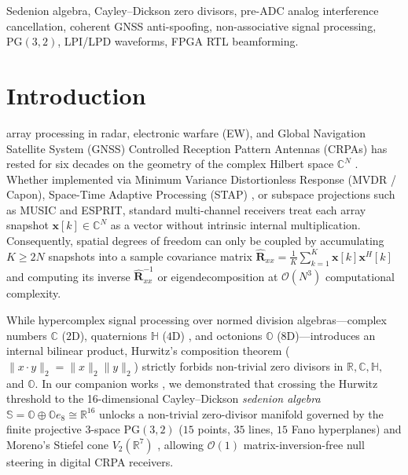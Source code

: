 \documentclass[journal,twoside]{IEEEtran}
\theoremstyle{definition}
\theoremstyle{remark}
\newcommand{\R}{\mathbb{R}}
\newcommand{\C}{\mathbb{C}}
\newcommand{\Ha}{\mathbb{H}}
\newcommand{\Oc}{\mathbb{O}}
\newcommand{\Se}{\mathbb{S}}
\newcommand{\PG}{\mathrm{PG}}
\begin{document}
\begin{IEEEkeywords}
Sedenion algebra, Cayley--Dickson zero divisors, pre-ADC analog interference cancellation, coherent GNSS anti-spoofing, non-associative signal processing, $\PG(3,2)$, LPI/LPD waveforms, FPGA RTL beamforming.
\end{IEEEkeywords}

\section{Introduction}
\label{sec:intro}
 array processing in radar, electronic warfare (EW), and Global Navigation Satellite System (GNSS) Controlled Reception Pattern Antennas (CRPAs) has rested for six decades on the geometry of the complex Hilbert space $\C^N$ \cite{Capon1969,VanTrees2002}. Whether implemented via Minimum Variance Distortionless Response (MVDR / Capon), Space-Time Adaptive Processing (STAP) \cite{Ward1994}, or subspace projections such as MUSIC and ESPRIT, standard multi-channel receivers treat each array snapshot $\bm{x}[k] \in \C^N$ as a vector without intrinsic internal multiplication. Consequently, spatial degrees of freedom can only be coupled by accumulating $K \ge 2N$ snapshots into a sample covariance matrix $\hat{\bm{R}}_{xx} = \frac{1}{K}\sum_{k=1}^K \bm{x}[k]\bm{x}^H[k]$ and computing its inverse $\hat{\bm{R}}_{xx}^{-1}$ or eigendecomposition at $\mathcal{O}(N^3)$ computational complexity.

While hypercomplex signal processing over normed division algebras---complex numbers $\C$ ($2\mathrm{D}$), quaternions $\Ha$ ($4\mathrm{D}$) \cite{Bihan2004,Enshaeifar2016}, and octonions $\Oc$ ($8\mathrm{D}$)—introduces an internal bilinear product, Hurwitz's composition theorem ($\|x\cdot y\|_2 = \|x\|_2\|y\|_2$) strictly forbids non-trivial zero divisors in $\R, \C, \Ha,$ and $\Oc$. In our companion works \cite{Agourakis2026PG32,Agourakis2026GNSS}, we demonstrated that crossing the Hurwitz threshold to the 16-dimensional Cayley--Dickson \emph{sedenion algebra} $\Se = \Oc \oplus \Oc e_8 \cong \R^{16}$ unlocks a non-trivial zero-divisor manifold governed by the finite projective 3-space $\PG(3,2)$ ($15$ points, $35$ lines, $15$ Fano hyperplanes) and Moreno's Stiefel cone $V_2(\R^7)$ \cite{Moreno1998}, allowing $\mathcal{O}(1)$ matrix-inversion-free null steering in digital CRPA receivers.
\end{document}
